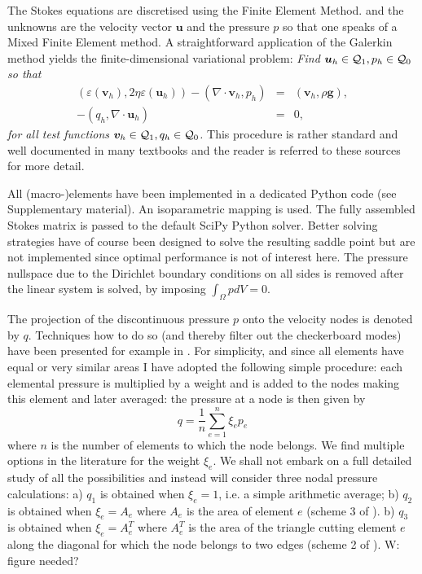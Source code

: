 \documentclass[a4paper,12pt]{article}
\begin{document}
The Stokes equations are discretised using the Finite Element Method.
and the unknowns are the velocity vector ${\bm u}$ and the pressure $p$ so that 
one speaks of a Mixed Finite Element method. 
A straightforward application of the Galerkin method yields the finite-dimensional 
variational problem: 
\textit{Find ${\bm u}_h\in {\cal Q}_1,p_h\in {\cal Q}_0$
so that
\begin{eqnarray}
\label{eq:discrete-formulation}
\left(\varepsilon(\bm v_h), 2\eta \varepsilon(\bm u_h)\right)  
- ( \nabla \cdot \bm v_h, p_h) &=&   ({\bm v}_h,\rho \bm g),\\
-(q_h,\nabla \cdot \bm u_h) &=& 0,
\end{eqnarray}
for all test functions ${\bm v}_h\in {\cal Q}_1, q_h\in {\cal Q}_0$.}
This procedure is rather standard and well documented in many 
textbooks \cite{grsa,dohu03,bobf13} and the reader is referred to these sources 
for more detail.

All (macro-)elements have been implemented in a dedicated Python code (see Supplementary material). 
An isoparametric mapping is used. 
The fully assembled Stokes matrix is passed to the default SciPy Python solver. 
Better solving strategies have of course 
been designed to solve the resulting saddle point \cite{begl05} but are not 
implemented since optimal performance is not of interest here.
The pressure nullspace due to the Dirichlet boundary conditions on all sides is removed 
after the linear system is solved, by imposing $\int_\Omega p dV= 0$.

The projection of the discontinuous pressure $p$ onto the velocity nodes is denoted by $q$. 
Techniques how to do so (and thereby filter out the checkerboard modes) have been presented 
for example in \cite{legs79,sagl81a,chpc95,thfb08}.
For simplicity, and since all elements have equal or very similar areas 
I have adopted the following simple procedure: each 
elemental pressure is multiplied by a weight and is added to the nodes making 
this element and later averaged: the pressure at a node is then given by
\[
q = \frac{1}{n} \sum_{e=1}^{n} \xi_e p_e
\]
where $n$ is the number of elements to which the node belongs.
We find multiple options in the literature for the weight $\xi_e$.
We shall not embark on a full detailed study of all the possibilities 
and instead will consider three nodal pressure calculations:
a) $q_1$ is obtained when $\xi_e=1$, i.e. a simple arithmetic average; 
b) $q_2$ is obtained when $\xi_e=A_e$ where $A_e$ is the area of element $e$
(scheme 3 of \cite{sagl81a}).
b) $q_3$ is obtained when $\xi_e=A_e^T$ where $A_e^T$ is the area of the triangle cutting
element $e$ along the diagonal for which the node belongs to two edges (scheme 2 of \cite{sagl81a}).
{\color{red} W: figure needed?}
\end{document}
